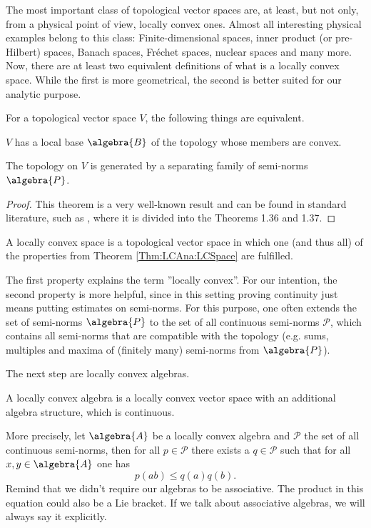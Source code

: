 The most important class of topological vector spaces are, at least, but not 
only, from a physical point of view, locally convex ones. Almost all 
interesting physical examples belong to this class: Finite-dimensional spaces, 
inner product (or pre-Hilbert) spaces, Banach spaces, Fr\'echet spaces, 
nuclear spaces and many more. Now, there are at least two equivalent 
definitions of what is a locally convex space. While the first is more 
geometrical, the second is better suited for our analytic purpose.
\begin{theorem}
	\label{Thm:LCAna:LCSpace}
	For a topological vector space $V$, the following things are equivalent.
	\begin{theoremlist}
		\item
		$V$ has a local base $\algebra{B}$ of the topology whose members are 
		convex.
		
		\item
		The topology on $V$ is generated by a separating family of semi-norms 
		$\algebra{P}$.
	\end{theoremlist}
\end{theorem}
\begin{proof}
	This theorem is a very well-known result and can be found in standard 
	literature, such as \cite{Rudin:Blue}, where it is divided into the 
	Theorems 1.36 and 1.37.
\end{proof}
\begin{definition}
	\label{Def:LCSpace}
	A locally convex space is a topological vector space in which one (and 
	thus all) of the properties from Theorem \ref{Thm:LCAna:LCSpace} are 
	fulfilled.
\end{definition}
The first property explains the term ''locally convex''. 
For our intention, the second property is more helpful, 
since in this setting proving continuity just means putting estimates on 
semi-norms. For this purpose, one often extends the set of semi-norms 
$\algebra{P}$ to the set of all continuous semi-norms $\mathcal{P}$, which 
contains all semi-norms that are compatible with the topology (e.g. sums, 
multiples and maxima of (finitely many) semi-norms from $\algebra{P}$).


The next step are locally convex algebras.
\begin{definition}
	\label{Def:LCAlgebra}
	A locally convex algebra is a locally convex vector space with an 
	additional algebra structure, which is continuous.
\end{definition}
More precisely, let $\algebra{A}$ be a locally convex algebra and 
$\mathcal{P}$ the set of all continuous semi-norms, then for all $p \in 
\mathcal{P}$ there exists a $q \in \mathcal{P}$ such that for all $x, y \in 
\algebra{A}$ one has
\begin{equation}
	\label{LCAna:ProductContinuity}
	p(a b)
	\leq
	q(a) q(b).
\end{equation}
Remind that we didn't require our algebras to be associative. The product in 
this equation could also be a Lie bracket. If we talk about associative 
algebras, we will always say it explicitly.



